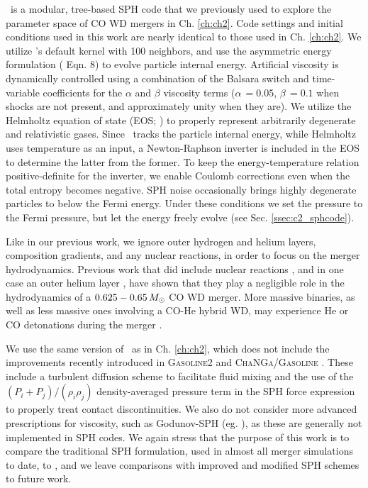\gasoline\ is a modular, tree-based SPH code that we previously used to explore the parameter space of CO WD mergers in Ch. \ref{ch:ch2}.  Code settings and initial conditions used in this work are nearly identical to those used in Ch. \ref{ch:ch2}.  We utilize \gasoline's default \cite{hernk89} kernel with 100 neighbors, and use the asymmetric energy formulation (\citeauthor{wadssq04} Eqn. 8) to evolve particle internal energy.  Artificial viscosity is dynamically controlled using a combination of the Balsara switch and time-variable coefficients for the $\alpha$ and $\beta$ viscosity terms ($\alpha\,=0.05$, $\beta\,=0.1$ when shocks are not present, and approximately unity when they are).  We utilize the Helmholtz equation of state (EOS; \citealt{timms00}) to properly represent arbitrarily degenerate and relativistic gases.  Since \gasoline\ tracks the particle internal energy, while Helmholtz uses temperature as an input, a Newton-Raphson inverter is included in the EOS to determine the latter from the former.  To keep the energy-temperature relation positive-definite for the inverter, we enable Coulomb corrections even when the total entropy becomes negative.  SPH noise occasionally brings highly degenerate particles to below the Fermi energy.  Under these conditions we set the pressure to the Fermi pressure, but let the energy freely evolve (see Sec. \ref{ssec:c2_sphcode}).

Like in our previous work, we ignore outer hydrogen and helium layers, composition gradients, and any nuclear reactions, in order to focus on the merger hydrodynamics.  Previous work that did include nuclear reactions \citep{loreig09,dan+12}, and in one case an outer helium layer \citep{rask+12}, have shown that they play a negligible role in the hydrodynamics of a $0.625 - 0.65\,\Msun$ CO WD merger.  More massive binaries, as well as less massive ones involving a CO-He hybrid WD, may experience He or CO detonations during the merger \citep{pakm+10, rask+12, dan+12, pakm+13}.

We use the same version of \gasoline\ as in Ch. \ref{ch:ch2}, which does not include the improvements recently introduced in \textsc{Gasoline2} \citep{kell+15, tamb+15} and \textsc{ChaNGa/Gasoline} \citep{gove+15}.  These include a turbulent diffusion scheme to facilitate fluid mixing \citep{shen+10} and the use of the $(P_i + P_j)/(\rho_i\rho_j)$ density-averaged pressure term in the SPH force expression \citep{kell+14} to properly treat contact discontinuities.  We also do not consider more advanced prescriptions for viscosity, such as Godunov-SPH (eg. \citealt{chaw16}), as these are generally not implemented in SPH codes.  We again stress that the purpose of this work is to compare the traditional SPH formulation, used in almost all merger simulations to date, to \arepo, and we leave comparisons with improved and modified SPH schemes to future work.

